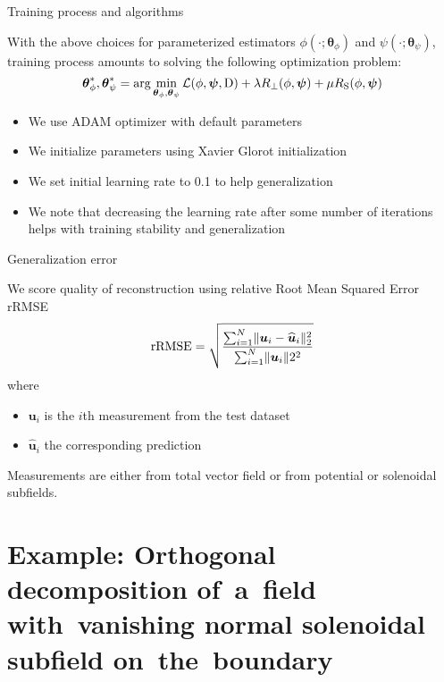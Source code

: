 \documentclass[11pt,aspectratio=169,t]{beamer}
\renewcommand{\vec}[1]{\boldsymbol{#1}}
\newcommand{\VTheta}{\ensuremath{\vec{\theta}}}
\DeclarePairedDelimiter\norm{\lVert}{\rVert}
\renewcommand{\hat}{\widehat}
\begin{document}
\begin{frame}{Training process and algorithms}

With the above choices for parameterized estimators $\phi(\cdot; \VTheta_{\phi})$
and $\psi(\cdot; \VTheta_{\psi})$, training process amounts to solving the following
optimization problem:
\[
\VTheta_{\phi}^{*}, \VTheta_{\psi}^{*} =
\arg \min_{\VTheta_\phi, \VTheta_\psi} \mathcal L(\phi, \vec \psi, \mathrm D)
  + \lambda R_{\perp}(\phi, \vec \psi) + \mu R_{\text S}(\phi, \vec \psi)
\]

\begin{itemize}
    \item We use ADAM optimizer with default parameters
    \item We initialize parameters using Xavier Glorot initialization
    \item We set initial learning rate to 0.1 to help generalization
    \item We note that decreasing the learning rate after some number
        of iterations helps with training stability and generalization
\end{itemize}
\end{frame}

\begin{frame}{Generalization error}

We score quality of reconstruction using relative Root Mean Squared Error rRMSE
\[
\text{rRMSE} = \sqrt{%
    \frac{%
    \sum_{i=1}^N \norm{\vec u_i - \hat{\vec u}_i}_2^2}{%
    \sum_{i=1}^N \norm{\vec u_i}2^2
    }
}
\]
where
\begin{itemize}
    \item $\vec u_{i}$ is the $i$th measurement from the test dataset
    \item $\hat{\vec u}_{i}$ the corresponding prediction
\end{itemize}

Measurements are either from total vector field
or from potential or solenoidal subfields.
\end{frame}

\section{Example: Orthogonal decomposition of~a~field with~vanishing normal solenoidal subfield on~the~boundary}
\end{document}
